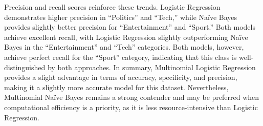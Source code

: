 \documentclass[
  12pt,
  letterpaper,
  DIV=11,
  numbers=noendperiod]{scrartcl}
\begin{document}
Precision and recall scores reinforce these trends. Logistic Regression
demonstrates higher precision in ``Politics'' and ``Tech,'' while Naïve
Bayes provides slightly better precision for ``Entertainment'' and
``Sport.'' Both models achieve excellent recall, with Logistic
Regression slightly outperforming Naïve Bayes in the ``Entertainment''
and ``Tech'' categories. Both models, however, achieve perfect recall
for the ``Sport'' category, indicating that this class is
well-distinguished by both approaches. In summary, Multinomial Logistic
Regression provides a slight advantage in terms of accuracy,
specificity, and precision, making it a slightly more accurate model for
this dataset. Nevertheless, Multinomial Naïve Bayes remains a strong
contender and may be preferred when computational efficiency is a
priority, as it is less resource-intensive than Logistic Regression.
\end{document}
